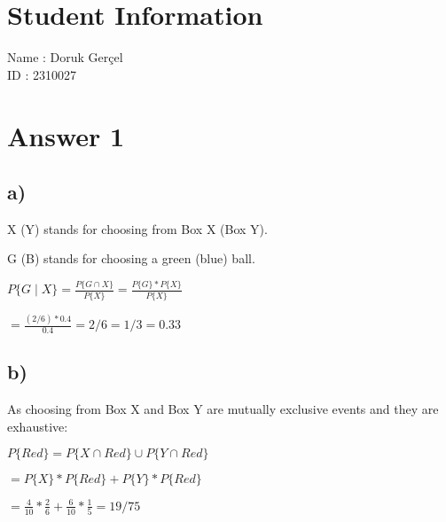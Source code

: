 \documentclass[12pt]{article}
\begin{document}
\section*{Student Information}

Name : Doruk Gerçel\\

ID : 2310027\\


\section*{Answer 1}
\subsection*{a)}
X (Y) stands for choosing from Box X (Box Y).\\ \par
G (B) stands for choosing a green (blue) ball.\\ \par 
$ P \lbrace G \mid X \rbrace = \frac{P \lbrace G \cap X \rbrace}{P \lbrace X \rbrace}
= \frac{P\lbrace G \rbrace \ast P\lbrace X \rbrace}{P \lbrace X \rbrace}$\\ \par
$= \frac{(2/6) \ast 0.4}{0.4} = 2/6 = 1/3 = 0.33$
\subsection*{b)}
As choosing from Box X and 	Box Y are mutually exclusive events and they are exhaustive: \\ \par
$P \lbrace Red \rbrace = P \lbrace X \cap Red \rbrace \cup P \lbrace Y \cap Red \rbrace$\\ \par
$= P \lbrace X \rbrace \ast P \lbrace Red \rbrace + P \lbrace Y \rbrace \ast P \lbrace Red \rbrace$\\ \par 
$= \frac{4}{10} \ast \frac{2}{6} + \frac{6}{10} \ast \frac{1}{5} = 19/75$
\end{document}
